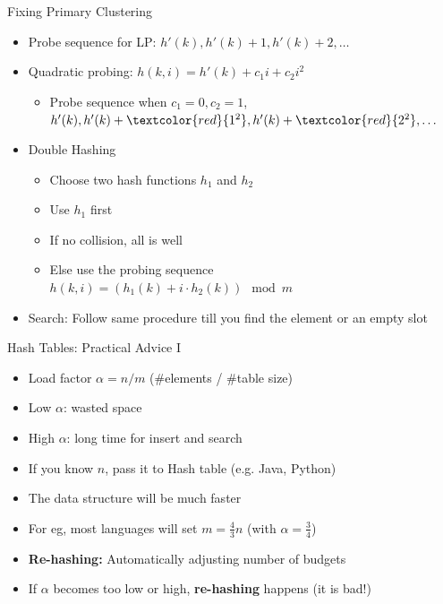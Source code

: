 \documentclass{beamer}
\begin{document}
\begin{frame}{Fixing Primary Clustering}
    \begin{itemize}
        \item Probe sequence for LP: $h'(k), h'(k)+1, h'(k)+2, \ldots$
        \item Quadratic probing:  $h(k,i) = h'(k) + c_1 i + c_2 i^2$
            \begin{itemize}
                \item Probe sequence when $c_1=0, c_2=1$,\\ 
                    \qquad $h'(k), h'(k)+\textcolor{red}{1^2}, h'(k)+\textcolor{red}{2^2}, \ldots$
            \end{itemize}
        \item Double Hashing
            \begin{itemize}
                \item Choose two hash functions $h_1$ and $h_2$
                \item Use $h_1$ first
                \item If no collision, all is well
                \item Else use the probing sequence \\ \qquad $h(k,i) = ( h_1(k) + i \cdot h_2(k)) \mod m$
            \end{itemize}
        \item Search: Follow same procedure till you find the element or an empty slot 
    \end{itemize}
\end{frame}

\begin{frame}{Hash Tables: Practical Advice I}
    \begin{itemize}
        \item Load factor $\alpha = n/m$ (\#elements / \#table size)
        \item Low $\alpha$: wasted space 
        \item High $\alpha$: long time for insert and search
        \item If you know $n$, pass it to Hash table (e.g. Java, Python)
        \item The data structure will be much faster
        \item For eg, most languages will set $m = \frac{4}{3} n$ (with $\alpha = \frac{3}{4}$)
        \item {\bf Re-hashing:} Automatically adjusting number of budgets
        \item If $\alpha$ becomes too low or high, {\bf re-hashing} happens (it is bad!)
    \end{itemize}
\end{frame}
\end{document}
